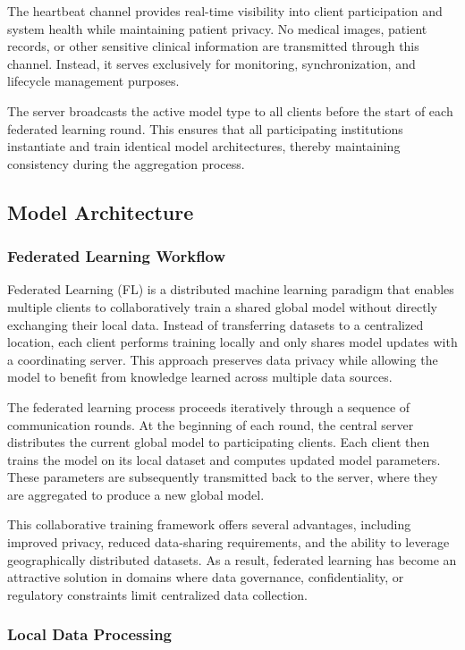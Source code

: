 The heartbeat channel provides real-time visibility into client participation and system health while maintaining patient privacy. No medical images, patient records, or other sensitive clinical information are transmitted through this channel. Instead, it serves exclusively for monitoring, synchronization, and lifecycle management purposes.

The server broadcasts the active model type to all clients before the start of each federated learning round. This ensures that all participating institutions instantiate and train identical model architectures, thereby maintaining consistency during the aggregation process.

\subsection{Model Architecture}
\subsubsection{Federated Learning Workflow}

Federated Learning (FL) is a distributed machine learning paradigm that enables multiple clients to collaboratively train a shared global model without directly exchanging their local data. Instead of transferring datasets to a centralized location, each client performs training locally and only shares model updates with a coordinating server. This approach preserves data privacy while allowing the model to benefit from knowledge learned across multiple data sources.

The federated learning process proceeds iteratively through a sequence of communication rounds. At the beginning of each round, the central server distributes the current global model to participating clients. Each client then trains the model on its local dataset and computes updated model parameters. These parameters are subsequently transmitted back to the server, where they are aggregated to produce a new global model.

This collaborative training framework offers several advantages, including improved privacy, reduced data-sharing requirements, and the ability to leverage geographically distributed datasets. As a result, federated learning has become an attractive solution in domains where data governance, confidentiality, or regulatory constraints limit centralized data collection.

\subsubsection{Local Data Processing}

